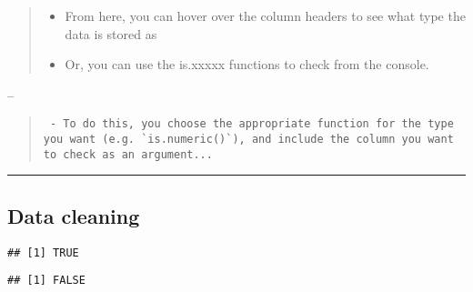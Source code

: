 \documentclass[]{article}
\newenvironment{Shaded}{\begin{snugshade}}{\end{snugshade}}
\newcommand{\CommentTok}[1]{\textcolor[rgb]{0.56,0.35,0.01}{\textit{#1}}}
\newcommand{\KeywordTok}[1]{\textcolor[rgb]{0.13,0.29,0.53}{\textbf{#1}}}
\newcommand{\NormalTok}[1]{#1}
\newcommand{\OperatorTok}[1]{\textcolor[rgb]{0.81,0.36,0.00}{\textbf{#1}}}
\providecommand{\tightlist}{%
  \setlength{\itemsep}{0pt}\setlength{\parskip}{0pt}}
\begin{document}
\begin{quote}
\begin{itemize}
\tightlist
\item
  From here, you can hover over the column headers to see what type the
  data is stored as
\item
  Or, you can use the is.xxxxx functions to check from the console.
\end{itemize}
\end{quote}

--

\begin{quote}
\begin{verbatim}
 - To do this, you choose the appropriate function for the type you want (e.g. `is.numeric()`), and include the column you want to check as an argument...
\end{verbatim}
\end{quote}

\begin{center}\rule{0.5\linewidth}{\linethickness}\end{center}

\hypertarget{data-cleaning-1}{%
\subsection{Data cleaning}\label{data-cleaning-1}}

\begin{Shaded}
\end{Shaded}

\begin{verbatim}
## [1] TRUE
\end{verbatim}

\begin{Shaded}
\end{Shaded}

\begin{verbatim}
## [1] FALSE
\end{verbatim}
\end{document}
